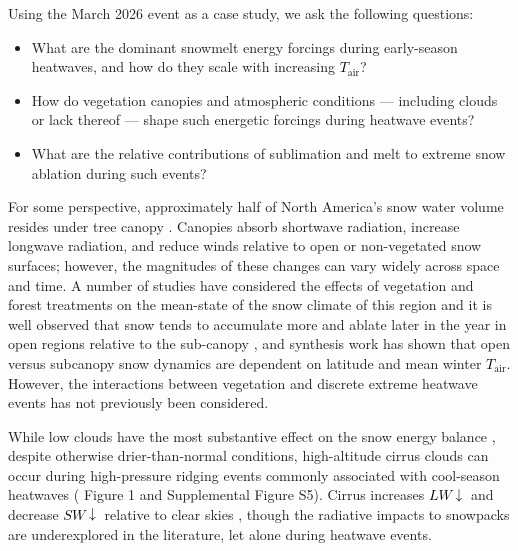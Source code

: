 \documentclass[draft]{agujournal2019}
\newcommand{\todo}[1]{\textcolor{purple}{TODO: #1}}      %
\newcommand{\tair}{\textcolor{black}{$T_{\mathrm{air}}$}\xspace}
\newcommand{\lwdn}{\textcolor{black}{$LW\downarrow$}\xspace}
\newcommand{\swdn}{\textcolor{black}{$SW\downarrow$}\xspace}
\begin{document}

Using the March 2026 event as a case study, we ask the following questions:
\begin{itemize}
  \item What are the dominant snowmelt energy forcings during early-season heatwaves, and how do they scale with increasing \tair?
  \item How do vegetation canopies and atmospheric conditions --- including clouds or lack thereof --- shape such energetic forcings during heatwave events?
  \item What are the relative contributions of sublimation and melt to extreme snow ablation during such events?
\end{itemize}

For some perspective, approximately half of North America's snow water volume resides under tree canopy \cite{Kim2021-eu}.
Canopies absorb shortwave radiation, increase longwave radiation, and reduce winds relative to open or non-vegetated snow surfaces; however, the magnitudes of these changes can vary widely across space and time.
A number of studies have considered the effects of vegetation and forest treatments on the mean-state of the snow climate of this region and it is well observed that snow tends to accumulate more and ablate later in the year in open regions relative to the sub-canopy \cite{Harpold2020-rc, Krogh2020-dh}, and synthesis work has shown
that  open versus subcanopy snow dynamics are dependent on latitude and mean winter \tair \cite{Lundquist2013-uc}.
However, the interactions between vegetation and discrete extreme heatwave events has not previously been considered.

While low clouds have the most substantive effect on the snow energy balance \cite{Rudisill2025-cx}, despite otherwise drier-than-normal conditions, high-altitude cirrus clouds can occur during high-pressure ridging events commonly associated with cool-season heatwaves ( Figure 1 and Supplemental Figure S5).
Cirrus increases \lwdn and decrease \swdn relative to clear skies \cite{L-Ecuyer2019-my}, though the radiative impacts to snowpacks are underexplored in the literature, let alone during heatwave events.
\end{document}

